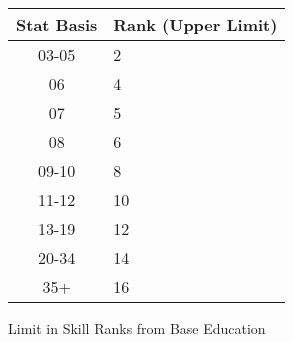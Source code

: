 
\begin{SHTable}[h]
	\begin{tabular}{c|l}
	Stat Basis & Rank (Upper Limit) \\
	\hline
	03-05		& 2 \\
	06			& 4 \\
	07			& 5 \\
	08			& 6 \\
	09-10		& 8 \\
	11-12		& 10 \\
	13-19		& 12 \\
	20-34		& 14 \\
	35+			& 16 \\
    \end{tabular}
    \caption{Limit in Skill Ranks from Base Education} \label{Table:SkillLimit}
\end{SHTable}


